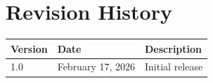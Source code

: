 \documentclass[11pt,letterpaper]{article}
\begin{document}
\section{Revision History}

\begin{tabularx}{\textwidth}{llX}
\toprule
\textbf{Version} & \textbf{Date} & \textbf{Description} \\
\midrule
1.0 & February 17, 2026 & Initial release \\
\bottomrule
\end{tabularx}
\end{document}
